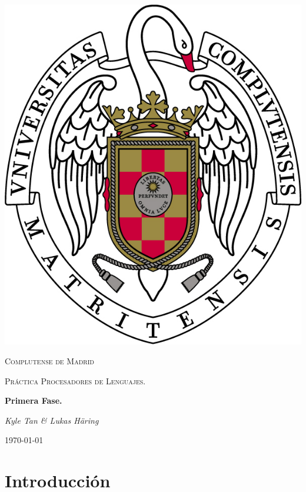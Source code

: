 \documentclass{article}
\begin{document}
\usetikzlibrary{automata,arrows, positioning}
\renewcommand{\contentsname}{Tabla de contenidos}

\begin{titlepage}
	\begin{center}
		\includegraphics{escudo.jpg}
	\end{center}
	\centering
	{\scshape\LARGE Complutense de Madrid \par}
	\vspace{1cm}
	{\scshape\Large Práctica Procesadores de Lenguajes.\par}
	\vspace{1.5cm}
	{\huge\bfseries Primera Fase. \par}
	\vspace{2cm}
	{\Large\itshape Kyle Tan \& Lukas Häring\par}
	\vfill
	\vfill

	{\large \today\par}
\end{titlepage}

\tableofcontents


\section{Introducción}
\newpage
\end{document}
